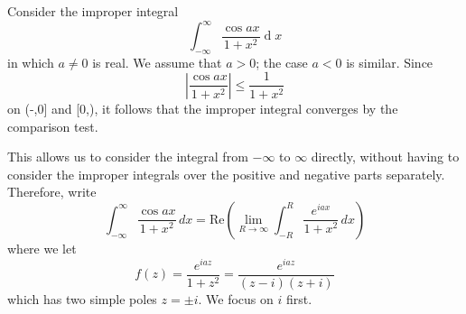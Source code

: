 \documentclass[12pt]{article}
\renewcommand{\d}{\ensuremath{\operatorname{d}}}
\begin{document}
\eg Consider the improper integral
\[\int_{-\infty}^{\infty}{\frac{\cos a x}{1+x^{2}}}\d x\]
in which $a \neq 0$ is real. We assume that $a > 0$; the case $a < 0$ is similar. Since\[\left|\frac{\cos a x}{1+x^{2}}\right|\leq \frac{1}{1+x^{2}}\] on (-\infty,0] and [0,\infty), it follows that the improper integral converges by the comparison test. 

This allows us to consider the integral from $-\infty$ to $\infty$ directly, without having to consider the improper integrals over the positive and negative parts separately. Therefore, write \[\int_{-\infty}^{\infty}\frac{\cos a x}{1+x^{2}}\,d x=\mathrm{Re}\left(\operatorname*{lim}_{R\rightarrow\infty}\int_{-R}^{R}\frac{e^{i a x}}{1+x^{2}}\,d x\right)
\] where we let \[f(z)=\frac{e^{i a z}}{1+z^{2}}=\frac{e^{i a z}}{(z-i)(z+i)}\]
which has two simple poles $z=\pm i$. We focus on $i$ first.
\end{document}
